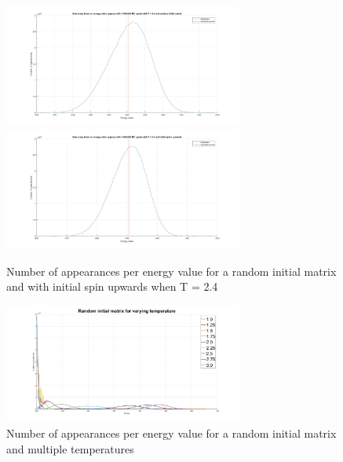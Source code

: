 \documentclass[10pt,a4paper]{article}
\begin{document}
\begin{figure}[H]
\centerline{
\includegraphics[width=0.7\textwidth]{energyappearanceT24random}
\includegraphics[width=0.7\textwidth]{energyappearanceT24upspin}
}
\caption{Number of appearances per energy value for a random initial matrix and with initial spin upwards when T = 2.4}
\label{fig:energyappearance}
\end{figure}
\begin{figure}[H]
\centerline{
\includegraphics[width=0.7\textwidth]{energyappearanceALL}
}
\caption{Number of appearances per energy value for a random initial matrix and multiple temperatures}
\label{fig:energyappearanceALL}
\end{figure}
\end{document}
